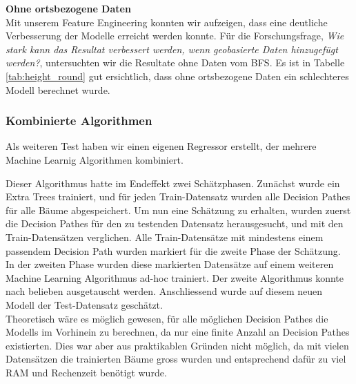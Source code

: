 \begin{table}[ht]
\centering
{}
\caption{Ergebnisse ohne ortsbezogenen Daten vom BFS}
\label{tab:height_round}
\end{table}

\newpage
\clearpage

\textbf{Ohne ortsbezogene Daten}\\
Mit unserem Feature Engineering konnten wir aufzeigen, dass eine deutliche Verbesserung der Modelle erreicht werden konnte. Für die Forschungsfrage, \textit{Wie stark kann das Resultat verbessert werden, wenn geobasierte Daten hinzugefügt werden?}, untersuchten wir die Resultate ohne Daten vom BFS. Es ist in Tabelle \ref{tab:height_round} gut ersichtlich, dass ohne ortsbezogene Daten ein schlechteres Modell berechnet wurde.

\subsubsection{Kombinierte Algorithmen}
Als weiteren Test haben wir einen eigenen Regressor erstellt, der mehrere Machine Learnig Algorithmen kombiniert.

Dieser Algorithmus hatte im Endeffekt zwei Schätzphasen. Zunächst wurde ein Extra Trees trainiert, und für jeden Train-Datensatz wurden alle Decision Pathes für alle Bäume abgespeichert. Um nun eine Schätzung zu erhalten, wurden zuerst die Decision Pathes für den zu testenden Datensatz herausgesucht, und mit den Train-Datensätzen verglichen. Alle Train-Datensätze mit mindestens einem passendem Decision Path wurden markiert für die zweite Phase der Schätzung.\\
In der zweiten Phase wurden diese markierten Datensätze auf einem weiteren Machine Learning Algorithmus ad-hoc trainiert. Der zweite Algorithmus konnte nach belieben ausgetauscht werden. Anschliessend wurde auf diesem neuen Modell der Test-Datensatz geschätzt.\\
Theoretisch wäre es möglich gewesen, für alle möglichen Decision Pathes die Modells im Vorhinein zu berechnen, da nur eine finite Anzahl an Decision Pathes existierten. Dies war aber aus praktikablen Gründen nicht möglich, da mit vielen Datensätzen die trainierten Bäume gross wurden und entsprechend dafür zu viel RAM und Rechenzeit benötigt wurde.


